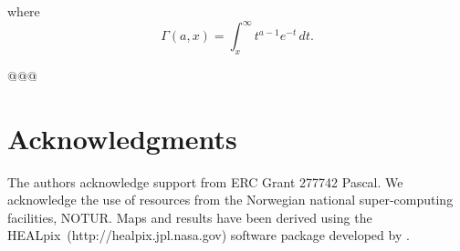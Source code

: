 \documentclass[aps,prd,showpacs,superscriptaddress,groupedaddress]{revtex4-1}  %
\newcommand{\healpix}{HEALpix~}
\begin{document}
where $$\Gamma(a,x)=\int_{x}^{\infty} t^{a-1}e^{-t}\,dt.$$

@@@

\section{Acknowledgments}
The authors acknowledge support from ERC Grant 277742 Pascal.
We acknowledge the use of resources from the
Norwegian national super-computing facilities, NOTUR. Maps and results
have been derived using the \healpix (http://healpix.jpl.nasa.gov)
software package developed by \cite{healpix}.






%

%
\end{document}
